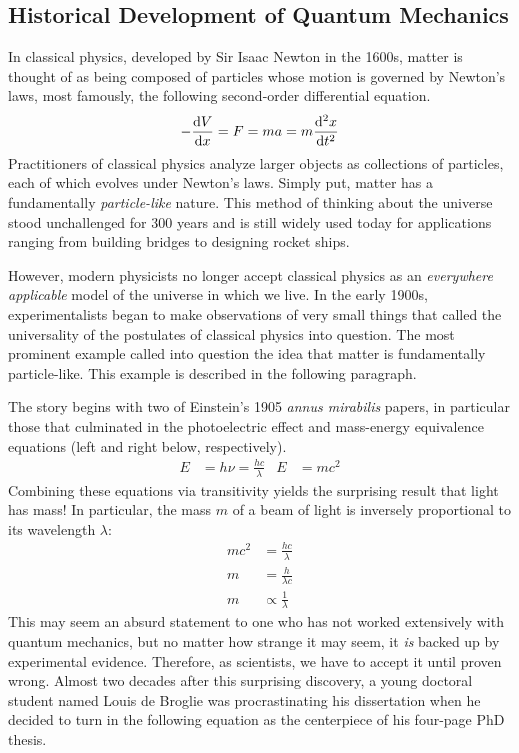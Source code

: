 \documentclass[titlepage]{article}
\numberwithin{equation}{section}
\begin{document}
\subsection{Historical Development of Quantum Mechanics}
In classical physics, developed by Sir Isaac Newton in the 1600s, matter is thought of as being composed of particles whose motion is governed by Newton's laws, most famously, the following second-order differential equation.
\begin{equation}\label{eqn:Newton2nd}
    -\dv{V}{x} = F 
    = ma
    = m\dv[2]{x}{t}
\end{equation}
Practitioners of classical physics analyze larger objects as collections of particles, each of which evolves under Newton's laws. Simply put, matter has a fundamentally \emph{particle-like} nature. This method of thinking about the universe stood unchallenged for 300 years and is still widely used today for applications ranging from building bridges to designing rocket ships.\par
However, modern physicists no longer accept classical physics as an \emph{everywhere applicable} model of the universe in which we live. In the early 1900s, experimentalists began to make observations of very small things that called the universality of the postulates of classical physics into question. The most prominent example called into question the idea that matter is fundamentally particle-like. This example is described in the following paragraph.\par
The story begins with two of Einstein's 1905 \emph{annus mirabilis} papers, in particular those that culminated in the photoelectric effect and mass-energy equivalence equations (left and right below, respectively).
\begin{align*}
    E &= h\nu = \frac{hc}{\lambda}&
    E &= mc^2
\end{align*}
Combining these equations via transitivity yields the surprising result that light has mass! In particular, the mass $m$ of a beam of light is inversely proportional to its wavelength $\lambda$:
\begin{align*}
    mc^2 &= \frac{hc}{\lambda}\\
    m &= \frac{h}{\lambda c}\\
    m &\propto \frac{1}{\lambda}
\end{align*}
This may seem an absurd statement to one who has not worked extensively with quantum mechanics, but no matter how strange it may seem, it \emph{is} backed up by experimental evidence. Therefore, as scientists, we have to accept it until proven wrong. Almost two decades after this surprising discovery, a young doctoral student named Louis de Broglie was procrastinating his dissertation when he decided to turn in the following equation as the centerpiece of his four-page PhD thesis.
\end{document}
